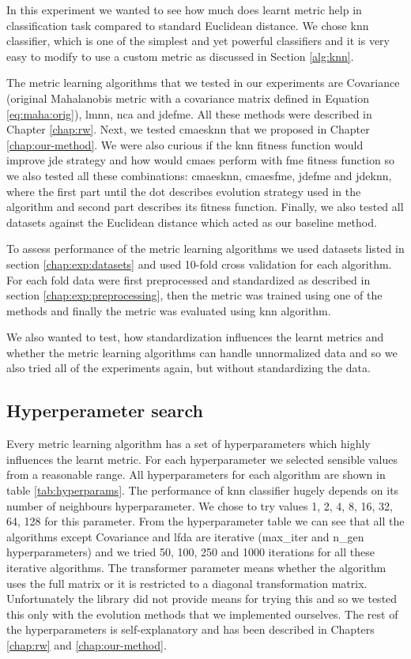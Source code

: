 \documentclass[12pt,a4paper]{report}
\begin{document}
In this experiment we wanted to see how much does learnt metric help in classification task compared to standard Euclidean distance. We chose \ac{knn} classifier, which is one of the simplest and yet powerful classifiers and it is very easy to modify to use a custom metric as discussed in Section \ref{alg:knn}.

The metric learning algorithms that we tested in our experiments are Covariance (original Mahalanobis metric with a covariance matrix defined in Equation \ref{eq:maha:orig}), \ac{lmnn}, \ac{nca} and \ac{jdefme}. All these methods were described in Chapter \ref{chap:rw}. Next, we tested \ac{cmaesknn} that we proposed in Chapter \ref{chap:our-method}. We were also curious if the \ac{knn} fitness function would improve \ac{jde} strategy and how would \ac{cmaes} perform with \ac{fme} fitness function so we also tested all these combinations: \ac{cmaesknn}, \ac{cmaesfme}, \ac{jdefme} and \ac{jdeknn}, where the first part until the dot describes evolution strategy used in the algorithm and second part describes its fitness function. Finally, we also tested all datasets against the Euclidean distance which acted as our baseline method.

To assess performance of the metric learning algorithms we used datasets listed in section \ref{chap:exp:datasets} and used 10-fold cross validation for each algorithm. For each fold data were first preprocessed and standardized as described in section \ref{chap:exp:preprocessing}, then the metric was trained using one of the methods and finally the metric was evaluated using \ac{knn} algorithm.

We also wanted to test, how standardization influences the learnt metrics and whether the metric learning algorithms can handle unnormalized data and so we also tried all of the experiments again, but without standardizing the data.

\subsection{Hyperperameter search} \label{chap:exp:hypsearch}

Every metric learning algorithm has a set of hyperparameters which highly influences the learnt metric. For each hyperparameter we selected sensible values from a reasonable range. All hyperparameters for each algorithm are shown in table \ref{tab:hyperparams}. The performance of \ac{knn} classifier hugely depends on its number of neighbours hyperparameter. We chose to try values 1, 2, 4, 8, 16, 32, 64, 128 for this parameter. From the hyperparameter table we can see that all the algorithms except Covariance and \ac{lfda} are iterative (max\_iter and n\_gen hyperparameters) and we tried 50, 100, 250 and 1000 iterations for all these iterative algorithms. The transformer parameter means whether the algorithm uses the full matrix or it is restricted to a diagonal transformation matrix. Unfortunately the library did not provide means for trying this and so we tested this only with the evolution methods that we implemented ourselves. The rest of the hyperparameters is self-explanatory and has been described in Chapters \ref{chap:rw} and \ref{chap:our-method}.
\end{document}
